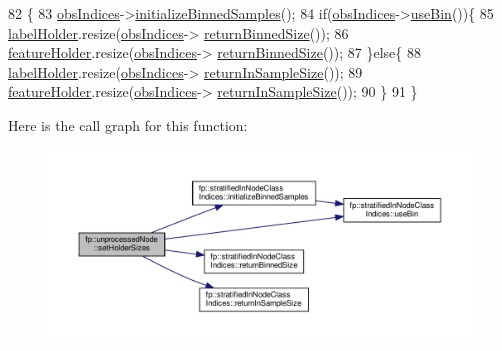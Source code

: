 \begin{DoxyCode}
82                                             \{
83                     \hyperlink{classfp_1_1unprocessedNode_aea171244695a3a099061188a9553e525}{obsIndices}->\hyperlink{classfp_1_1stratifiedInNodeClassIndices_ae9907f8984615f91417fb7961e1b582d}{initializeBinnedSamples}();
84                     \textcolor{keywordflow}{if}(\hyperlink{classfp_1_1unprocessedNode_aea171244695a3a099061188a9553e525}{obsIndices}->\hyperlink{classfp_1_1stratifiedInNodeClassIndices_af740a8054cefe977f8f1288fc6b39109}{useBin}())\{
85                         \hyperlink{classfp_1_1unprocessedNode_a99524f9266d6fcf979f15ef445e629ca}{labelHolder}.resize(\hyperlink{classfp_1_1unprocessedNode_aea171244695a3a099061188a9553e525}{obsIndices}->
      \hyperlink{classfp_1_1stratifiedInNodeClassIndices_a9f77fe5e638170c4ad4ce99541561cfc}{returnBinnedSize}());
86                         \hyperlink{classfp_1_1unprocessedNode_adbc4f28ec96b3ac3690cd28e71274bc5}{featureHolder}.resize(\hyperlink{classfp_1_1unprocessedNode_aea171244695a3a099061188a9553e525}{obsIndices}->
      \hyperlink{classfp_1_1stratifiedInNodeClassIndices_a9f77fe5e638170c4ad4ce99541561cfc}{returnBinnedSize}());
87                     \}\textcolor{keywordflow}{else}\{
88                         \hyperlink{classfp_1_1unprocessedNode_a99524f9266d6fcf979f15ef445e629ca}{labelHolder}.resize(\hyperlink{classfp_1_1unprocessedNode_aea171244695a3a099061188a9553e525}{obsIndices}->
      \hyperlink{classfp_1_1stratifiedInNodeClassIndices_a596235ffec7250fabd2818d395b39c66}{returnInSampleSize}());
89                         \hyperlink{classfp_1_1unprocessedNode_adbc4f28ec96b3ac3690cd28e71274bc5}{featureHolder}.resize(\hyperlink{classfp_1_1unprocessedNode_aea171244695a3a099061188a9553e525}{obsIndices}->
      \hyperlink{classfp_1_1stratifiedInNodeClassIndices_a596235ffec7250fabd2818d395b39c66}{returnInSampleSize}());
90                     \}
91                 \}
\end{DoxyCode}
Here is the call graph for this function\+:\nopagebreak
\begin{figure}[H]
\begin{center}
\leavevmode
\includegraphics[width=350pt]{classfp_1_1unprocessedNode_ae1aa4f8f868fe19c8e48d3fe1e5596a8_cgraph}
\end{center}
\end{figure}
\mbox{\label{classfp_1_1unprocessedNode_a713ab68816b13b1a82d667ac6f1640d7}} 
